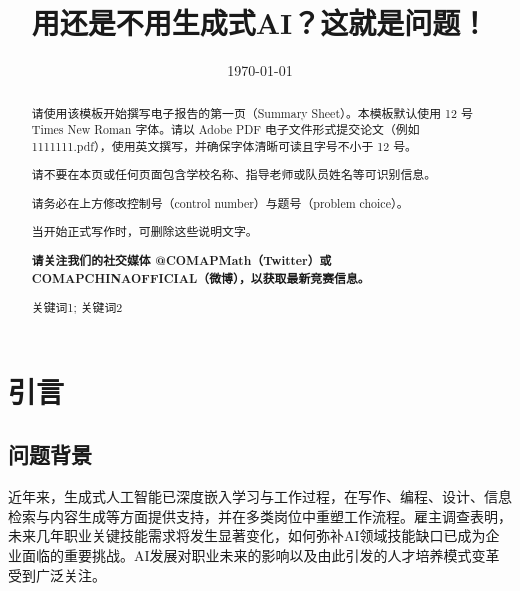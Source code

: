 \documentclass{mcmthesis}
\title{用还是不用生成式AI？这就是问题！}
\date{\today}
\begin{document}
\begin{abstract}
\par 请使用该模板开始撰写电子报告的第一页（Summary Sheet）。本模板默认使用 12 号 Times New Roman 字体。请以 Adobe PDF 电子文件形式提交论文（例如 1111111.pdf），使用英文撰写，并确保字体清晰可读且字号不小于 12 号。

请不要在本页或任何页面包含学校名称、指导老师或队员姓名等可识别信息。

请务必在上方修改控制号（control number）与题号（problem choice）。

当开始正式写作时，可删除这些说明文字。

\textbf{请关注我们的社交媒体 @COMAPMath（Twitter）或 COMAPCHINAOFFICIAL（微博），以获取最新竞赛信息。}

\begin{keywords}
关键词1; 关键词2
\end{keywords}
\end{abstract}



\maketitle
\tableofcontents
\newpage



\section{引言}

\subsection{问题背景}
\noindent 近年来，生成式人工智能已深度嵌入学习与工作过程，在写作、编程、设计、信息检索与内容生成等方面提供支持，并在多类岗位中重塑工作流程。雇主调查表明，未来几年职业关键技能需求将发生显著变化，如何弥补AI领域技能缺口已成为企业面临的重要挑战。AI发展对职业未来的影响以及由此引发的人才培养模式变革受到广泛关注。
\end{document}
